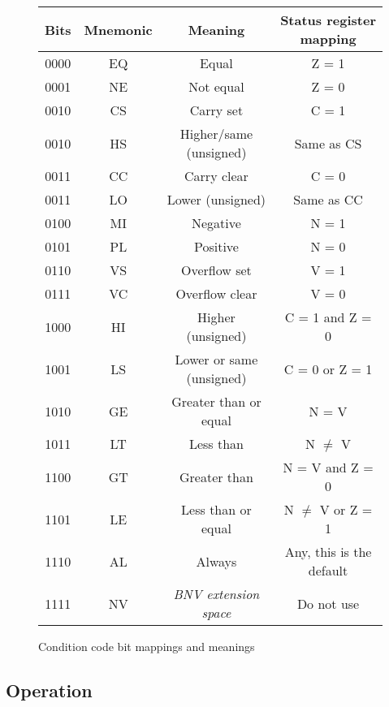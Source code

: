 \documentclass[a4paper,twoside,openany]{book}
\begin{document}
        \begin{figure}[h]
          \begin{tabular}{c c c c}
            Bits & Mnemonic & Meaning            & Status register mapping\\
            \hline
            0000 & EQ & Equal                    & Z = 1\\
            0001 & NE & Not equal                & Z = 0\\
            0010 & CS & Carry set                & C = 1\\
            0010 & HS & Higher/same (unsigned)   & Same as CS\\
            0011 & CC & Carry clear              & C = 0\\
            0011 & LO & Lower (unsigned)         & Same as CC\\
            0100 & MI & Negative                 & N = 1\\
            0101 & PL & Positive                 & N = 0\\
            0110 & VS & Overflow set             & V = 1\\
            0111 & VC & Overflow clear           & V = 0\\
            1000 & HI & Higher (unsigned)        & C = 1 and Z = 0\\
            1001 & LS & Lower or same (unsigned) & C = 0 or Z = 1\\
            1010 & GE & Greater than or equal    & N = V\\
            1011 & LT & Less than                & N $\ne$ V\\
            1100 & GT & Greater than             & N = V and Z = 0\\
            1101 & LE & Less than or equal       & N $\ne$ V or Z = 1\\
            1110 & AL & Always                   & Any, this is the default\\
            1111 & NV & \emph{BNV extension space} & Do not use\\
          \end{tabular}
          \caption{Condition code bit mappings and meanings}
        \end{figure}
        
      
      \subsection*{Operation}
      
\end{document}
